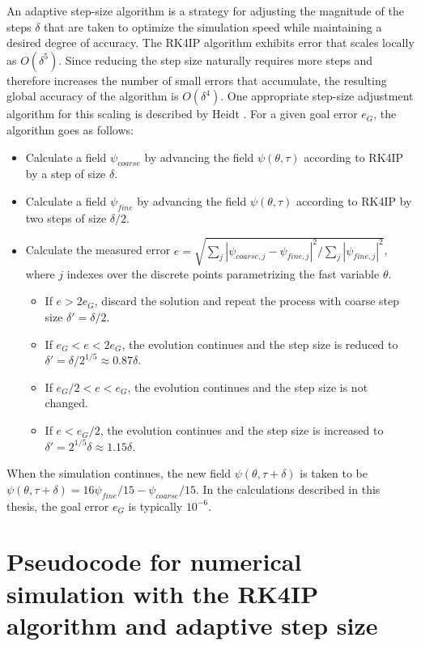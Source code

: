 An adaptive step-size algorithm is a strategy for adjusting the magnitude of the steps $\delta$ that are taken to optimize the simulation speed while maintaining a desired degree of accuracy. The RK4IP algorithm exhibits error that scales locally as $O(\delta^5)$. Since reducing the step size naturally requires more steps and therefore increases the number of small errors that accumulate, the resulting global accuracy of the algorithm is $O(\delta^4)$. One appropriate step-size adjustment algorithm for this scaling is described by Heidt \cite{Heidt2009}. For a given goal error $e_G$, the algorithm goes as follows:
\begin{itemize}
	\item Calculate a field $\psi_{coarse}$ by advancing the field $\psi(\theta,\tau)$ according to RK4IP by a step of size $\delta$.
	\item Calculate a field $\psi_{fine}$ by advancing the field $\psi(\theta,\tau)$ according to RK4IP by two steps of size $\delta/2$. 
	\item Calculate the measured error $e=\sqrt{\sum_j |\psi_{coarse,j}-\psi_{fine,j}|^2/\sum_j|\psi_{fine,j}|^2}$, where $j$ indexes over the discrete points parametrizing the fast variable $\theta$. 
	\begin{itemize}
		\item If $e>2e_G$, discard the solution and repeat the process with coarse step size $\delta'=\delta/2$.
		\item If $e_G<e<2e_G$, the evolution continues and the step size is reduced to $\delta'=\delta/2^{1/5}\approx0.87\delta$. 
		\item If $e_G/2<e<e_G$, the evolution continues and the step size is not changed.
		\item If $e<e_G/2$, the evolution continues and the step size is increased to $\delta'=2^{1/5}\delta\approx1.15\delta$.
		\end{itemize}
\end{itemize}

When the simulation continues, the new field $\psi(\theta,\tau+\delta)$ is taken to be $\psi(\theta,\tau+\delta)=16\psi_{fine}/15-\psi_{coarse}/15$. In the calculations described in this thesis, the goal error $e_G$ is typically $10^{-6}$.

\section{Pseudocode for numerical simulation with the RK4IP algorithm and adaptive step size}



